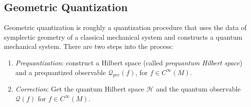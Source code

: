 \documentclass[11pt]{amsart}
\numberwithin{equation}{section}
\theoremstyle{plain}
\theoremstyle{definition}
\theoremstyle{remark}
\newcommand{\calH}{\mathcal{H}}
\begin{document}
\subsection{Geometric Quantization}
Geometric quantization is roughly a quantization procedure that uses the data of symplectic geometry of a classical mechanical system and constructs a quantum mechanical system. There are two steps into the process: 
\begin{enumerate}[(Step1)]
\item{\emph{Prequantization}: construct a Hilbert space (called \emph{prequantum Hilbert space}) and a prequantized observable $\mathscr{Q}_{pre}(f)$, for $f\in C^\infty(M)$.
}
\item{\emph{Correction}: Get the quantum Hilbert space $\calH$ and the quantum observable $\mathscr{Q}(f)$ for $f\in C^\infty(M)$.
}
\end{enumerate}
\end{document}
